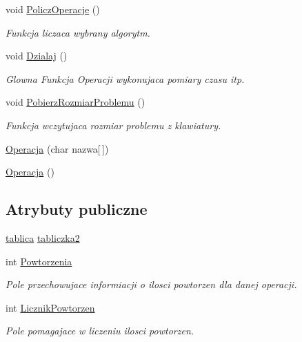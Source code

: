 \begin{DoxyCompactItemize}
void \hyperlink{class_operacja_add37253efa90cee5fa332cde6e163bab}{Policz\-Operacje} ()
\begin{DoxyCompactList}\small\item\em Funkcja liczaca wybrany algorytm. \end{DoxyCompactList}\item 
void \hyperlink{class_operacja_add48398ebfeae90a0d1b58a31962fd7d}{Dzialaj} ()
\begin{DoxyCompactList}\small\item\em Glowna Funkcja Operacji wykonujaca pomiary czasu itp. \end{DoxyCompactList}\item 
void \hyperlink{class_operacja_afa1d33f2045ce668becc90b56c1b6907}{Pobierz\-Rozmiar\-Problemu} ()
\begin{DoxyCompactList}\small\item\em Funkcja wczytujaca rozmiar problemu z klawiatury. \end{DoxyCompactList}\item 
\hyperlink{class_operacja_a9bfc12b2dfc5f736d46cf5d6c342f782}{Operacja} (char nazwa\mbox{[}$\,$\mbox{]})
\item 
\hyperlink{class_operacja_a1624fb5817c0b60e1680509fc4517732}{Operacja} ()
\end{DoxyCompactItemize}
\subsection*{Atrybuty publiczne}
\begin{DoxyCompactItemize}
\item 
\hyperlink{classtablica}{tablica} \hyperlink{class_operacja_abf2eb42f0b32b1528939aa39e0ebd528}{tabliczka2}
\item 
int \hyperlink{class_operacja_aa568b17d05f31132b3d97eb5b7e93d61}{Powtorzenia}
\begin{DoxyCompactList}\small\item\em Pole przechowujace informiacji o ilosci powtorzen dla danej operacji. \end{DoxyCompactList}\item 
int \hyperlink{class_operacja_a9af6bfee62f233a584f368a626e8329e}{Licznik\-Powtorzen}
\begin{DoxyCompactList}\small\item\em Pole pomagajace w liczeniu ilosci powtorzen. \end{DoxyCompactList}\end{DoxyCompactItemize}


